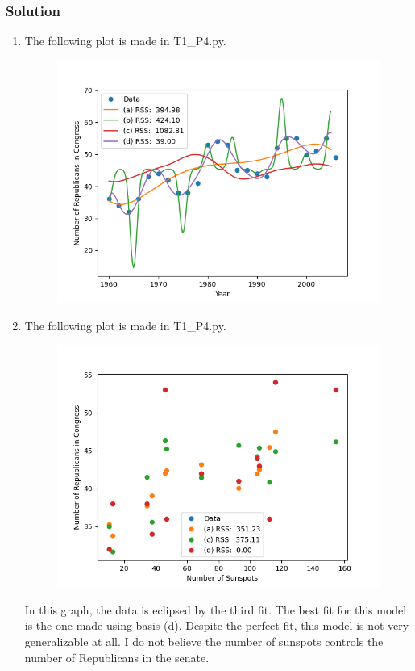\documentclass[submit]{harvardml}
\begin{document}
\newpage
\subsubsection*{Solution}

\begin{enumerate}

\item The following plot is made in T1\_P4.py.

\begin{figure}[h]
\includegraphics[scale=0.8]{P4_1}
\centering
\end{figure}

\newpage
\item The following plot is made in T1\_P4.py.

\begin{figure}[h]
\includegraphics[scale=0.8]{P4_2}
\centering
\end{figure}

In this graph, the data is eclipsed by the third fit. The best fit for this 
model is the one made using basis (d). Despite the perfect fit, this model
is not very generalizable at all. I do not believe the number of sunspots controls
the number of Republicans in the senate.

\end{enumerate}
\end{document}

